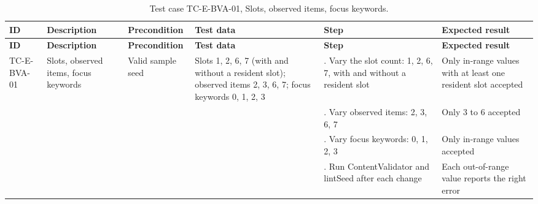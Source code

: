 {\footnotesize{}\renewcommand{\arraystretch}{1.1}
\begin{longtable}{|>{\raggedright\arraybackslash}p{}|>{\raggedright\arraybackslash}p{}|>{\raggedright\arraybackslash}p{}|>{\raggedright\arraybackslash}p{}|>{\raggedright\arraybackslash}p{}|>{\raggedright\arraybackslash}p{}|}
\caption{Test case TC-\allowbreak{}E-\allowbreak{}BVA-\allowbreak{}01, Slots, observed items, focus keywords.} \\
\hline
\textbf{ID} & \textbf{Description} & \textbf{Precondition} & \textbf{Test data} & \textbf{Step} & \textbf{Expected result} \\ \hline
\endfirsthead
\hline
\textbf{ID} & \textbf{Description} & \textbf{Precondition} & \textbf{Test data} & \textbf{Step} & \textbf{Expected result} \\ \hline
\endhead
TC-E-BVA-01 & Slots, observed items, focus keywords & Valid sample seed & Slots 1, 2, 6, 7 (with and without a resident slot); observed items 2, 3, 6, 7; focus keywords 0, 1, 2, 3 & 1. Vary the slot count: 1, 2, 6, 7, with and without a resident slot & Only in-range values with at least one resident slot accepted \\ \cline{5-6}
 &  &  &  & 2. Vary observed items: 2, 3, 6, 7 & Only 3 to 6 accepted \\ \cline{5-6}
 &  &  &  & 3. Vary focus keywords: 0, 1, 2, 3 & Only in-range values accepted \\ \cline{5-6}
 &  &  &  & 4. Run ContentValidator and lintSeed after each change & Each out-\allowbreak{}of-\allowbreak{}range value reports the right error \\ \hline
\end{longtable}
}

